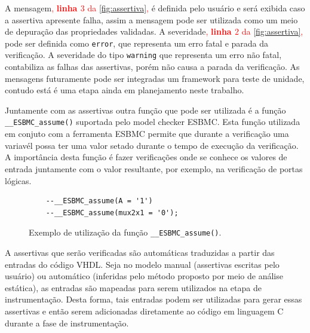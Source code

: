 \par
A mensagem\textcolor{red}{, \textbf{linha $3$} da \autoref{fig:assertiva},} é definida pelo usuário e será exibida caso a assertiva apresente falha, assim a mensagem pode ser utilizada como um meio de depuração das propriedades validadas. A severidade\textcolor{red}{, \textbf{linha $2$} da \autoref{fig:assertiva},} pode ser definida como \texttt{error}, que representa um erro fatal e parada da verificação. A severidade do tipo \texttt{warning} que representa um erro não fatal, contabiliza as falhas das assertivas, porém não causa a parada da verificação. As mensagens futuramente pode ser integradas um framework para teste de unidade, contudo está é uma etapa ainda em planejamento neste trabalho.

\par
Juntamente com as assertivas outra função que pode ser utilizada é a função \texttt{\_\_ESBMC\allowbreak{}\_assume()} suportada pelo model checker ESBMC. Esta função utilizada em conjuto com a ferramenta ESBMC permite que durante a verificação uma variavél possa ter uma valor setado durante o tempo de execução da verificação. A importância desta função é fazer verificações onde se conhece os valores de entrada juntamente com o valor resultante, por exemplo, na verificação de portas lógicas.

\begin{figure}[H]
\caption{\label{fig:assertiva_assume} Exemplo de utilização da função \texttt{\_\_ESBMC\_assume()}.}
	\begin{center}
    \begin{minipage}{0.99\textwidth}
    \begin{lstlisting}       
    --__ESBMC_assume(A = '1')
    --__ESBMC_assume(mux2x1 = '0');
    \end{lstlisting}
    \end{minipage}
	\end{center}
\end{figure}

\par
A assertivas que serão verificadas são automáticas traduzidas a partir das entradas do código VHDL. Seja no modelo manual (assertivas escritas pelo usuário) ou automático (inferidas pelo método proposto por meio de análise estática), as entradas são mapeadas para serem utilizados na etapa de instrumentação. Desta forma, tais entradas podem ser utilizadas para gerar essas assertivas e então serem adicionadas diretamente ao código em linguagem C durante a fase de instrumentação.

